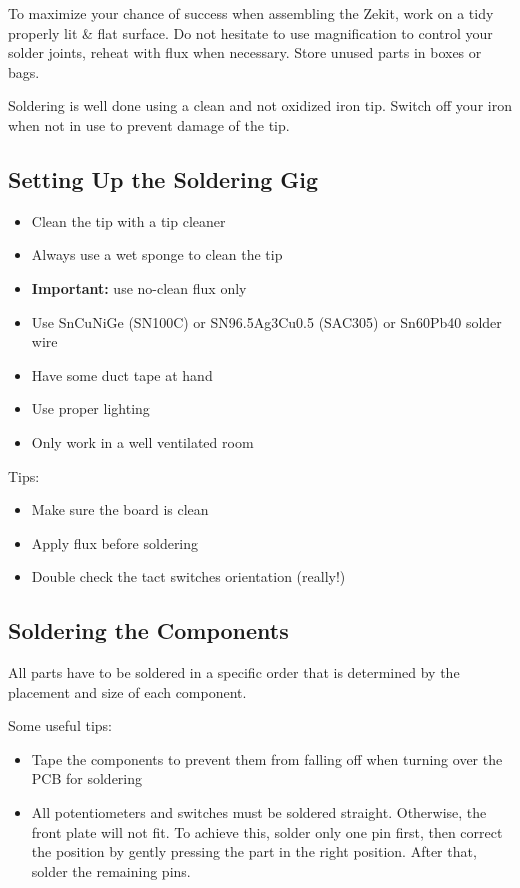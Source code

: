 \documentclass{scrartcl}
\begin{document}
To maximize your chance of success when assembling the Zekit, work on a tidy properly lit \& flat surface. Do not hesitate to use magnification to control your solder joints, reheat with flux when necessary. Store unused parts in boxes or bags.

Soldering is well done using a clean and not oxidized iron tip. Switch off your iron when not in use to prevent damage of the tip.

\subsection{Setting Up the Soldering Gig}

\begin{itemize}
    \item Clean the tip with a tip cleaner
    \item Always use a wet sponge to clean the tip
    \item \textbf{Important:} use no-clean flux only
    \item Use SnCuNiGe (SN100C) or SN96.5Ag3Cu0.5 (SAC305) or Sn60Pb40 solder wire
    \item Have some duct tape at hand
    \item Use proper lighting
    \item Only work in a well ventilated room
\end{itemize}

Tips:

\begin{itemize}
    \item Make sure the board is clean
    \item Apply flux before soldering
    \item Double check the tact switches orientation (really!)
\end{itemize}

\subsection{Soldering the Components}

All parts have to be soldered in a specific order that is determined by the placement and size of each component.

Some useful tips:

\begin{itemize}
    \item Tape the components to prevent them from falling off when turning over the PCB for soldering
    \item All potentiometers and switches must be soldered straight. Otherwise, the front plate will not fit. To achieve this, solder only one pin first, then correct the position by gently pressing the part in the right position. After that, solder the remaining pins.
\end{itemize}
\end{document}
